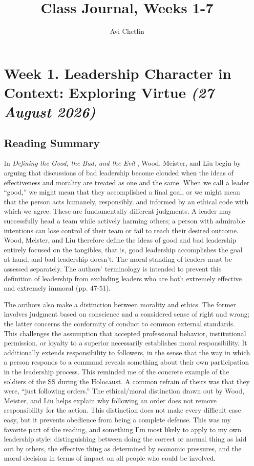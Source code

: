 \documentclass[12pt,stu,biblatex]{apa7}
\author{Avi Chetlin}
\affiliation{Case Western Reserve University}
\title{Class Journal, Weeks 1-7}
\begin{document}
\maketitle
\singlespacing
\tableofcontents
\newpage

\section{Week 1. Leadership Character in Context: Exploring Virtue \textit{(27 August 2026)}}

\subsection{Reading Summary}

In \textit{Defining the Good, the Bad, and the Evil} \parencite{wood2021goodbadevil}, Wood, Meister, and Liu begin by arguing that discussions of bad leadership become clouded when the ideas of effectiveness and morality are treated as one and the same.
When we call a leader ``good,'' we might mean that they accomplished a final goal, or we might mean that the person acts humanely, responsibly, and informed by an ethical code with which we agree.
These are fundamentally different judgments.
A leader may successfully head a team while actively harming others; a person with admirable intentions can lose control of their team or fail to reach their desired outcome.
Wood, Meister, and Liu therefore define the ideas of good and bad leadership entirely focused on the tangibles, that is, good leadership accomplishes the goal at hand, and bad leadership doesn't.
The moral standing of leaders must be assessed separately.
The authors' terminology is intended to prevent this definition of leadership from excluding leaders who are both extremely effective and extremely immoral (pp. 47-51).

The authors also make a distinction between morality and ethics. The former involves judgment based on conscience and a considered sense of right and wrong; the latter concerns the conformity of conduct to common external standards.
This challenges the assumption that accepted professional behavior, institutional permission, or loyalty to a superior necessarily establishes moral responsibility.
It additionally extends responsibility to followers, in the sense that the way in which a person responds to a command reveals something about their own participation in the leadership process.
This reminded me of the concrete example of the soldiers of the SS during the Holocaust.
A common refrain of theirs was that they were, ``just following orders.''
The ethical/moral distinction drawn out by Wood, Meister, and Liu helps explain why following an order does not remove responsibility for the action.
This distinction does not make every difficult case easy, but it prevents obedience from being a complete defense.
This was my favorite part of the reading, and something I'm most likely to apply to my own leadership style; distinguishing between doing the correct or normal thing as laid out by others, the effective thing as determined by economic pressures, and the moral decision in terms of impact on all people who could be involved.
\end{document}

